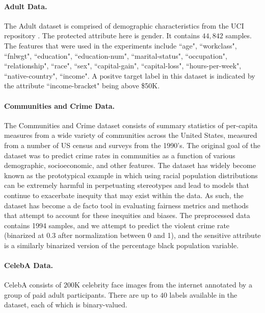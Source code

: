 \paragraph{Adult Data.}
The Adult dataset is comprised of demographic characteristics  from the UCI repository \citep{uci}. The protected attribute here is gender. It contains $44,842$ samples. The features that were used in the experiments include ``age", ``workclass", ``fnlwgt", ``education",                           ``education-num", ``marital-status", ``occupation",
                          ``relationship", ``race", ``sex", ``capital-gain",
                           ``capital-loss", ``hours-per-week", ``native-country",
                           ``income". A positve target label in this dataset is indicated by the attribute ``income-bracket" being above \$50K.
                           
\paragraph{Communities and Crime Data.}
The Communities and Crime dataset consists of summary statistics of per-capita measures from a wide variety of communities across the United States, measured from a number of US census and surveys from the 1990's. The original goal of the dataset was to predict crime rates in communities as a function of various demographic, socioeconomic, and other features. The dataset has widely become known as the prototypical example in which using racial population distributions can be extremely harmful in perpetuating stereotypes and lead to models that continue to exacerbate inequity that may exist within the data.
As such, the dataset has become a de facto tool in evaluating fairness metrics and methods that attempt to account for these inequities and biases. The preprocessed data contains 1994 samples, and we attempt to predict the violent crime rate (binarized at 0.3 after normalization between 0 and 1), and the sensitive attribute is a similarly binarized version of the percentage black population variable.

\paragraph{CelebA Data.}
CelebA \citep{liu2015faceattributes} consists of $200$K celebrity face images from the internet annotated by a group of paid adult participants. There are up to $40$ labels available in the dataset, each of which is binary-valued.